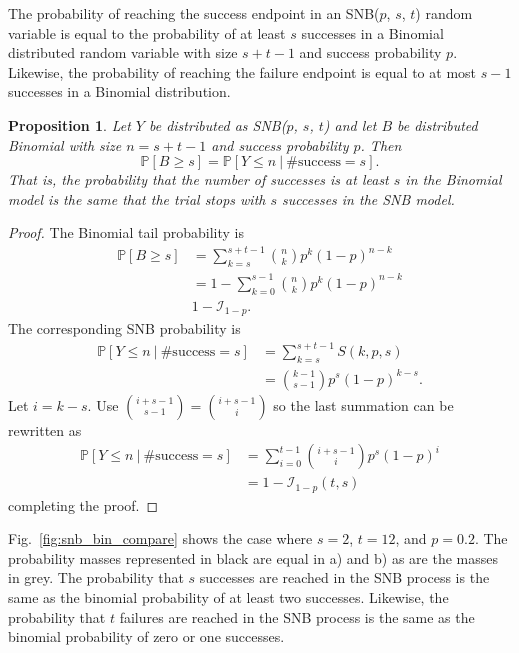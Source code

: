 \documentclass[review]{elsarticle}
\newtheorem{prop}{Proposition}
\begin{document}
The probability of reaching the success endpoint in an 
SNB($p$, $s$, $t$) random variable is 
equal to the probability of at least $s$ successes in a Binomial distributed 
random variable with size $s+t-1$ and success probability $p$. 
Likewise, the probability of reaching the failure endpoint is equal
to at most $s-1$ successes in a Binomial distribution.
\begin{prop} \label{binomial_tail}
Let $Y$ be distributed as SNB($p$, $s$, $t$) and let 
$B$ be distributed Binomial with size $n=s+t-1$ and success probability
$p$. Then
\begin{equation}
\mathbb{P}[B \geq s] = \mathbb{P} [Y \leq n\ |\ \text{\#success} = s].
\end{equation}
That is, the probability that the number of successes is at least $s$
in the Binomial model is the same that the trial stops with $s$ 
successes in the SNB model.
\end{prop}
\begin{proof}
The Binomial tail probability is
\begin{align*}
\mathbb{P}[B \geq s] &= \sum_{k=s}^{s+t-1} {n \choose k} p^k (1-p)^{n-k} \\
  &= 1 - \sum_{k=0}^{s-1} {n \choose k} p^k (1-p)^{n-k} \\
  & 1 - \mathcal{I}_{1-p}.
\end{align*}
The corresponding SNB probability is
\begin{align*}
\mathbb{P} [Y \leq n\ |\ \text{\#success}=s] &= \sum_{k=s}^{s+t-1} S(k, p, s)\\
 &= {k-1 \choose s-1} p^s (1-p)^{k-s}.
\end{align*}
Let $i=k-s$. Use ${i+s-1 \choose s-1} = {i+s-1 \choose i}$
so the last summation can be rewritten as
\begin{align}
\mathbb{P} [Y \leq n\ |\ \text{\#success} = s] &= \sum_{i=0}^{t-1} 
  {i+s-1 \choose i} p^s (1-p)^i\\
  &= 1 - \mathcal{I}_{1-p}(t, s)
\end{align}
completing the proof.
\end{proof}

Fig.~\ref{fig:snb_bin_compare} shows the case
where $s=2$, $t=12$, and $p=0.2$.  The probability masses represented in 
black are equal in a) and b) as are the masses in grey.
The probability that $s$
successes are reached in the SNB process is the same as the binomial 
probability of at least two successes. Likewise, the probability that $t$ 
failures are reached in the SNB process is the same as the binomial
probability of zero or one successes.
\end{document}
